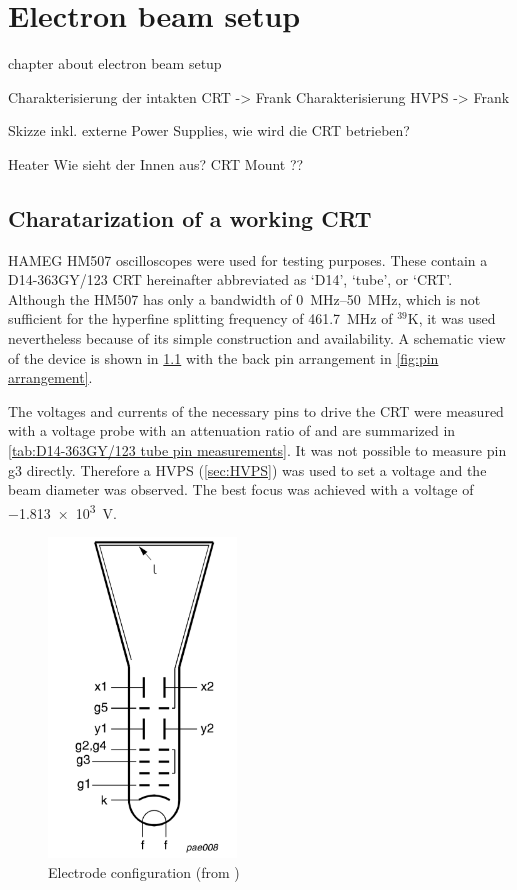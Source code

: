 \chapter{Electron beam setup}\label{ch:Electron beam setup}

chapter about electron beam setup

Charakterisierung der intakten CRT -> Frank 
Charakterisierung HVPS ->  Frank 

Skizze inkl. externe Power Supplies, wie wird die CRT betrieben?

Heater
Wie sieht der Innen aus? 
CRT Mount ??

\section{Charatarization of a working CRT}\label{sec:Charatarization of a working CRT}

HAMEG HM507 oscilloscopes were used for testing purposes. These contain a D14-363GY/123\autocite{tubedata} CRT hereinafter abbreviated as `D14', `tube', or `CRT'. Although the HM507 has only a bandwidth of \SIrange{0}{50}{\mega\hertz}, which is not sufficient for the hyperfine splitting frequency of \SI{461.7}{\mega\hertz} of $^{39}\mathrm{K}$, it was used nevertheless because of its simple construction and availability. A schematic view of the device is shown in \cref{fig:electrode configuration} with the back pin arrangement in \cref{fig:pin arrangement}.

The voltages and currents of the necessary pins to drive the CRT were measured with a voltage probe  with an attenuation ratio of  and are summarized in \cref{tab:D14-363GY/123 tube pin measurements}. It was not possible to measure pin g3 directly. Therefore a HVPS (\cref{sec:HVPS}) was used to set a voltage and the beam diameter was observed. The best focus was achieved with a voltage of \SI{-1.813e3}{\volt}.

\begin{figure}[H]
	\centering
	\includegraphics[width=5cm]{./Chapters/e-beam-setup/electrode configuration}
	\caption{Electrode configuration (from \autocite{tubedata})}
	\label{fig:electrode configuration}
\end{figure}

